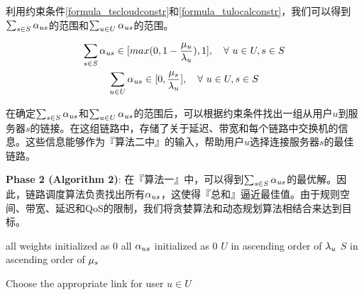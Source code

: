 利用约束条件\eqref{formula_tscloudconstr}和\eqref{formula_tulocalconstr}，我们可以得到$\sum_{s \in S}{\alpha}_{us}$的范围和$\sum_{u \in U}{\alpha}_{us}$的范围。

\begin{equation*}
\begin{gathered}
\sum_{s \in S}{\alpha}_{us} \in [max(0, 1- \frac{{\mu}_{u}}{{\lambda}_{u}}), 1], \quad \forall\ u \in U, s \in S\\
\sum_{u \in U}{\alpha}_{us} \in [0, \frac{{\mu}_{s}}{{\lambda}_{u}}], \quad \forall\ u \in U, s \in S
\end{gathered}
\end{equation*}

在确定$\sum_{s \in S}{\alpha}_{us}$和$\sum_{u \in U}{\alpha}_{us}$的范围后，可以根据约束条件找出一组从用户$u$到服务器$s$的链接。在这组链路中，存储了关于延迟、带宽和每个链路中交换机的信息。这些信息能够作为『算法二中』的输入，帮助用户$u$选择连接服务器$s$的最佳链路。

\textbf{Phase 2 (Algorithm 2)}:
在『算法一』中，可以得到$\sum_{s \in S}{\alpha}_{us}$的最优解。因此，链路调度算法负责找出所有${\alpha}_{us}$，这使得『总和』逼近最佳值。由于规则空间、带宽、延迟和QoS的限制，我们将贪婪算法和动态规划算法相结合来达到目标。

\begin{algorithm}[h]
\setstretch{\algostretch}
all weights initialized as $0$
all ${\alpha}_{us}$ initialized as $0$
$U$ in ascending order of ${\lambda}_{u}$
$S$ in ascending order of ${\mu}_{s}$
\KwOut{$\xusl$}
\caption{Choose the appropriate link for user $u \in U$}
\label{algo_findminpaths}
\end{algorithm}

